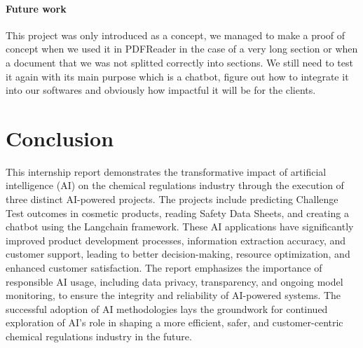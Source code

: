 \documentclass[a4paper,12pt,twoside]{report}
\begin{document}
\subsubsection{Future work}
This project was only introduced as a concept, we managed to make a proof of concept when we used it in PDFReader in the case of a very long section or when a document that we was not splitted correctly into sections. We still need to test it again with its main purpose which is a chatbot, figure out how to integrate it into our softwares and obviously how impactful it will be for the clients.

\chapter*{Conclusion}
This internship report demonstrates the transformative impact of artificial intelligence (AI) on the chemical regulations industry through the execution of three distinct AI-powered projects. The projects include predicting Challenge Test outcomes in cosmetic products, reading Safety Data Sheets, and creating a chatbot using the Langchain framework. These AI applications have significantly improved product development processes, information extraction accuracy, and customer support, leading to better decision-making, resource optimization, and enhanced customer satisfaction. The report emphasizes the importance of responsible AI usage, including data privacy, transparency, and ongoing model monitoring, to ensure the integrity and reliability of AI-powered systems. The successful adoption of AI methodologies lays the groundwork for continued exploration of AI's role in shaping a more efficient, safer, and customer-centric chemical regulations industry in the future.





\appendix
\appendixpage
\addappheadtotoc
\end{document}
